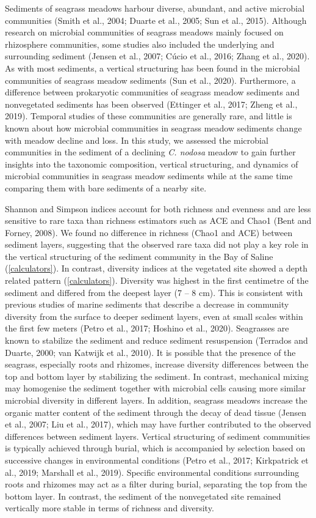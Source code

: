 \documentclass[12pt,]{article}
\begin{document}
Sediments of seagrass meadows harbour diverse, abundant, and active
microbial communities (Smith et al., 2004; Duarte et al., 2005; Sun et
al., 2015). Although research on microbial communities of seagrass
meadows mainly focused on rhizosphere communities, some studies also
included the underlying and surrounding sediment (Jensen et al., 2007;
Cúcio et al., 2016; Zhang et al., 2020). As with most sediments, a
vertical structuring has been found in the microbial communities of
seagrass meadow sediments (Sun et al., 2020). Furthermore, a difference
between prokaryotic communities of seagrass meadow sediments and
nonvegetated sediments has been observed (Ettinger et al., 2017; Zheng
et al., 2019). Temporal studies of these communities are generally rare,
and little is known about how microbial communities in seagrass meadow
sediments change with meadow decline and loss. In this study, we
assessed the microbial communities in the sediment of a declining
\emph{C. nodosa} meadow to gain further insights into the taxonomic
composition, vertical structuring, and dynamics of microbial communities
in seagrass meadow sediments while at the same time comparing them with
bare sediments of a nearby site.

Shannon and Simpson indices account for both richness and evenness and
are less sensitive to rare taxa than richness estimators such as ACE and
Chao1 (Bent and Forney, 2008). We found no difference in richness (Chao1
and ACE) between sediment layers, suggesting that the observed rare taxa
did not play a key role in the vertical structuring of the sediment
community in the Bay of Saline (\autoref{calculators}). In contrast,
diversity indices at the vegetated site showed a depth related pattern
(\autoref{calculators}). Diversity was highest in the first centimetre
of the sediment and differed from the deepest layer (7 -- 8 cm). This is
consistent with previous studies of marine sediments that describe a
decrease in community diversity from the surface to deeper sediment
layers, even at small scales within the first few meters (Petro et al.,
2017; Hoshino et al., 2020). Seagrasses are known to stabilize the
sediment and reduce sediment resuspension (Terrados and Duarte, 2000;
van Katwijk et al., 2010). It is possible that the presence of the
seagrass, especially roots and rhizomes, increase diversity differences
between the top and bottom layer by stabilizing the sediment. In
contrast, mechanical mixing may homogenise the sediment together with
microbial cells causing more similar microbial diversity in different
layers. In addition, seagrass meadows increase the organic matter
content of the sediment through the decay of dead tissue (Jensen et al.,
2007; Liu et al., 2017), which may have further contributed to the
observed differences between sediment layers. Vertical structuring of
sediment communities is typically achieved through burial, which is
accompanied by selection based on successive changes in environmental
conditions (Petro et al., 2017; Kirkpatrick et al., 2019; Marshall et
al., 2019). Specific environmental conditions surrounding roots and
rhizomes may act as a filter during burial, separating the top from the
bottom layer. In contrast, the sediment of the nonvegetated site
remained vertically more stable in terms of richness and diversity.
\end{document}
